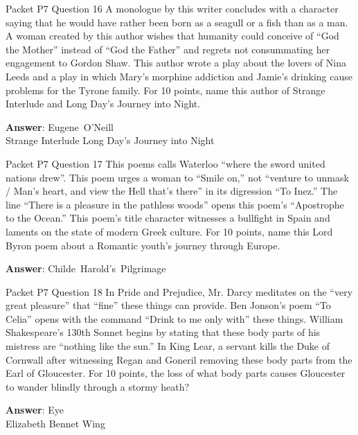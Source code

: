 \begin{frame}{Packet P7 Question 16}
A monologue by this writer concludes with a character saying that he would have rather been born as a seagull or a fish than as a man. A woman created by this author wishes that humanity could conceive of “God the Mother” instead of “God the Father” and regrets not consummating her engagement to Gordon Shaw. This author wrote a play about the lovers of Nina Leeds and a play in which   Mary’s morphine     addiction and Jamie’s   drinking cause problems for the Tyrone family. For 10 points,   name this author of Strange Interlude and Long Day’s Journey   into Night.

\textbf{Answer}: Eugene\ O'Neill\\
 Strange Interlude
 Long Day's Journey into Night
\end{frame}

\begin{frame}{Packet P7 Question 17}
This poems calls Waterloo ``where the sword united nations drew''. This poem urges a woman to “Smile on,”   not “venture to unmask / Man's heart, and view the Hell that's there” in its digression “To Inez.” The line “There is a pleasure in the pathless woods” opens this poem’s “Apostrophe to the Ocean.” This poem’s title character witnesses a bullfight in Spain and   laments on the state of modern Greek culture. For 10 points, name this Lord Byron     poem about a Romantic youth’s journey through Europe.

\textbf{Answer}: Childe\ Harold's\ Pilgrimage\\
\end{frame}

\begin{frame}{Packet P7 Question 18}
In Pride and Prejudice, Mr. Darcy meditates   on the “very great pleasure” that “fine” these things can provide. Ben Jonson’s poem “To Celia” opens with the command “Drink to me only with” these things. William Shakespeare’s 130th Sonnet begins by stating that these body parts of his mistress are “nothing like the sun.” In King Lear, a servant kills the Duke of   Cornwall after witnessing Regan and Goneril removing these body parts from the Earl     of Gloucester. For 10 points, the loss of what body parts causes Gloucester to wander blindly through a stormy heath?

\textbf{Answer}: Eye\\
 Elizabeth Bennet
 Wing
\end{frame}

